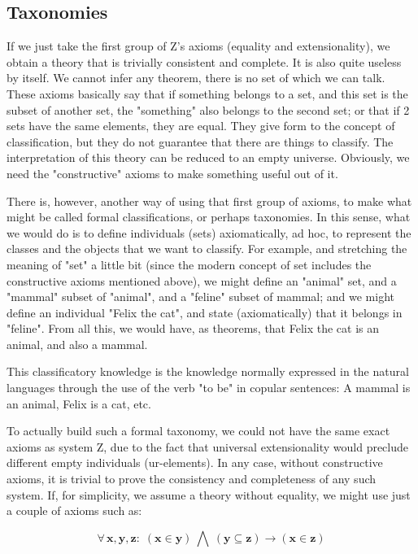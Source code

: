 \documentclass{IOS-Book-Article}     %
\begin{document}
\subsection{Taxonomies}
If we just take the first group of Z's axioms (equality and extensionality),
we obtain a theory that is trivially consistent and complete. It is also
quite useless by itself. We cannot infer any theorem, there is no set of which
we can talk. These axioms basically say that if something belongs to a set,
and this set is the subset of another set, the "something" also belongs to the
second set; or that if 2 sets have the same elements, they are equal.  They
give form to the concept of classification, but they do not guarantee that
there are things to classify.  The interpretation of this theory can be reduced
to an empty universe. Obviously, we need the "constructive" axioms to make
something useful out of it.

There is, however, another way of using that first group of axioms,
to make what might be called formal classifications, or perhaps taxonomies.
In this sense, what we would do is to define individuals (sets) axiomatically,
ad hoc, to represent the classes and the objects that we want to classify.
For example, and stretching the meaning of "set" a little bit (since the
modern concept of set includes the constructive axioms mentioned above),
we might define an "animal" set, and a "mammal" subset of "animal",
and a "feline" subset of mammal; and we might define an individual
"Felix the cat", and state (axiomatically) that it belongs in "feline".
From all this, we would have, as theorems, that Felix the cat is an animal,
and also a mammal.

This classificatory knowledge is the knowledge normally expressed
in the natural languages through the use of the verb "to be" in
copular sentences: A mammal is an animal, Felix is a cat, etc.

To actually build such a formal taxonomy, we could not have the same exact
axioms as system Z, due to the fact that universal extensionality would
preclude different empty individuals (ur-elements). In any case, without
constructive axioms, it is trivial to prove the consistency and completeness
of any such system. If, for simplicity, we assume a theory without equality,
we might use just a couple of axioms such as:

\begin{equation}
\forall\,\mathbf{x\mathrm{,\mathbf{y\mathrm{,\mathbf{z}:\;\left(\mathbf{x\in y}\right)\:\bigwedge\:\left(\mathbf{y\subseteq\mathbf{z}}\right)\rightarrow\left(\mathbf{x\in\mathbf{z}}\right)}}}}
\end{equation}
\end{document}
